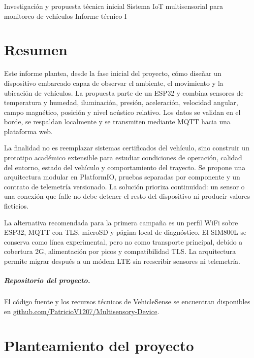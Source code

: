 \documentclass[11pt,a4paper,oneside]{report}
\begin{document}
\VScover
  {Investigación y propuesta técnica inicial}
  {Sistema IoT multisensorial para monitoreo de vehículos}
  {Informe técnico I}

\chapter*{Resumen}
Este informe plantea, desde la fase inicial del proyecto, cómo diseñar un dispositivo
embarcado capaz de observar el ambiente, el movimiento y la ubicación de vehículos.
La propuesta parte de un ESP32 y combina sensores de
temperatura y humedad, iluminación, presión, aceleración, velocidad angular, campo
magnético, posición y nivel acústico relativo. Los datos se validan en el borde,
se respaldan localmente y se transmiten mediante MQTT hacia una plataforma web.

La finalidad no es reemplazar sistemas certificados del vehículo, sino construir un
prototipo académico extensible para estudiar condiciones de operación, calidad del
entorno, estado del vehículo y comportamiento del trayecto. Se propone una
arquitectura modular en PlatformIO, pruebas separadas por componente y un contrato de
telemetría versionado. La solución prioriza continuidad: un sensor o una conexión que
falle no debe detener el resto del dispositivo ni producir valores ficticios.

\begin{vsidea}[title={Resultado de la investigación}]
La alternativa recomendada para la primera campaña es un perfil WiFi sobre ESP32,
MQTT con TLS, microSD y página local de diagnóstico. El SIM800L se conserva como
línea experimental, pero no como transporte principal, debido a cobertura 2G,
alimentación por picos y compatibilidad TLS. La arquitectura permite migrar después a
un módem LTE sin reescribir sensores ni telemetría.
\end{vsidea}

\paragraph{Repositorio del proyecto.}
El código fuente y los recursos técnicos de VehicleSense se encuentran disponibles en
\href{https://github.com/PatricioV1207/Multisensory-Device}{github.com/PatricioV1207/Multisensory-Device}.

\tableofcontents
\listoffigures
\clearpage
{}

\chapter{Planteamiento del proyecto}
\end{document}
